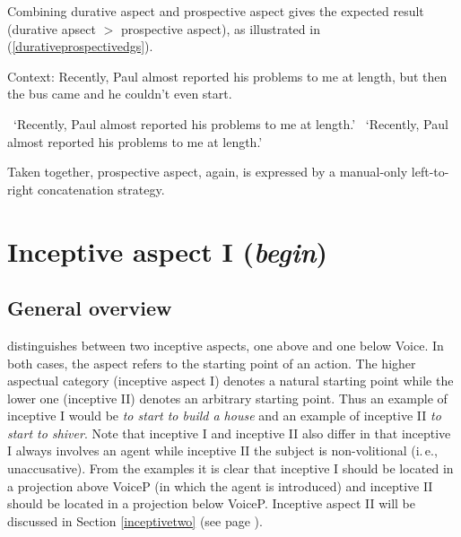 \noindent Combining durative aspect and prospective aspect gives the expected result (durative apsect $>$ prospective aspect), as illustrated in (\ref{durativeprospectivedgs}).

\begin{exe}
\ex Context: Recently, Paul almost reported his problems to me at length, but then the bus came and he couldn't even start. \label{durativeprospectivedgs}\begin{xlist} 
\glt \textcolor{white}{*}`Recently, Paul almost reported his problems to me at length.' \label{ex:durativeprospectivedgsa}
\glt \textcolor{white}{*}`Recently, Paul almost reported his problems to me at length.' \label{ex:durativeprospectivedgsb}
\end{xlist}
\end{exe} 

\noindent Taken together, prospective aspect, again, is expressed by a manual-only left-to-right concatenation strategy.


\section{Inceptive aspect I (\textit{begin})}\label{inceptiveoneaaa}
\subsection{General overview}
\citet{cinque1999adverbs, cinque2006restructuring} distinguishes between two inceptive aspects, one above and one below Voice. In both cases, the aspect refers to the starting point of an action. The higher aspectual category (inceptive aspect I) denotes a natural starting point while the lower one (inceptive II) denotes an arbitrary starting point. Thus an example of inceptive I would be \textit{to start to build a house} and an example of inceptive II \textit{to start to shiver}. Note that inceptive I and inceptive II also differ in that inceptive I always involves an agent while inceptive II the subject is non-volitional (i.\,e., unaccusative). From the examples it is clear that inceptive I should be located in a projection above VoiceP (in which the agent is introduced) and inceptive II should be located in a projection below VoiceP. Inceptive aspect II will be discussed in Section \ref{inceptivetwo} (see page \pageref{inceptivetwo}).

